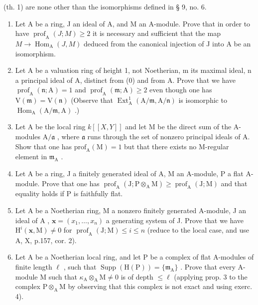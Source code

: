 (th. 1) are none other than the isomorphisms defined in § 9, no. 6.



\begin{enumerate}
\def\labelenumi{\arabic{enumi})}
\item
  Let A be a ring, J an ideal of A, and M an A-module. Prove that in order to have \(\operatorname{prof}_{\mathrm{A}}(J;M)\geqslant2\) it is necessary and sufficient that the map \(M\to\operatorname{Hom}_{\mathrm{A}}(J,M)\) deduced from the canonical injection of J into A be an isomorphism.
\item
  Let A be a valuation ring of height 1, not Noetherian, m its maximal ideal, n a principal ideal of A, distinct from (0) and from A. Prove that we have \(\operatorname{prof}_{\mathrm{A}}(\mathfrak{n};\mathrm{A})=1\) and \(\operatorname{prof}_{\mathrm{A}}(\mathfrak{m};\mathrm{A})\geqslant2\) even though one has \(\mathrm{V}(\mathfrak{m})=\mathrm{V}(\mathfrak{n})\) (Observe that \(\operatorname{Ext}_{\mathrm{A}}^{1}(\mathrm{A}/\mathfrak{m},\mathrm{A}/\mathfrak{n})\) is isomorphic to \(\operatorname{Hom}_{\mathrm{A}}(\mathrm{A}/\mathfrak{m},\mathrm{A})\) .)
\item
  Let A be the local ring \(k[[X,Y]]\) and let M be the direct sum of the A-modules \(\mathrm{A}/\mathfrak{a}\) , where \(\mathfrak{a}\) runs through the set of nonzero principal ideals of A. Show that one has \(\mathrm{prof}_{\mathrm{A}}(\mathrm{M}) = 1\) but that there exists no M-regular element in \(\mathfrak{m}_{\mathrm{A}}\) .
\item
  Let A be a ring, J a finitely generated ideal of A, M an A-module, P a flat A-module. Prove that one has \(\operatorname{prof}_{\mathrm{A}}(\mathrm{J};\mathrm{P}\otimes_{\mathrm{A}}\mathrm{M})\geqslant\operatorname{prof}_{\mathrm{A}}(\mathrm{J};\mathrm{M})\) and that equality holds if P is faithfully flat.
\item
  Let \(\mathrm{A}\) be a Noetherian ring, M a nonzero finitely generated A-module, J an ideal of \(\mathrm{A}\) , \(\mathbf{x} = (x_1, \ldots, x_n)\) a generating system of J. Prove that we have \(\mathrm{H}^i(\mathbf{x}, \mathrm{M}) \neq 0\) for \(\operatorname{prof}_{\mathrm{A}}(\mathrm{J}; \mathrm{M}) \leqslant i \leqslant n\) (reduce to the local case, and use A, X, p.157, cor. 2).
\item
  Let A be a Noetherian local ring, and let P be a complex of flat A-modules of finite length \(\ell\) , such that \(\operatorname{Supp}(\mathrm{H}(\mathrm{P})) = \{\mathfrak{m}_{\mathrm{A}}\}\) . Prove that every A-module M such that \(\kappa_{\mathrm{A}} \otimes_{\mathrm{A}} \mathrm{M} \neq 0\) is of depth \(\leqslant \ell\) (applying prop. 3 to the complex \(\mathrm{P} \otimes_{\mathrm{A}} \mathrm{M}\) by observing that this complex is not exact and using exerc. 4).

\end{enumerate}
